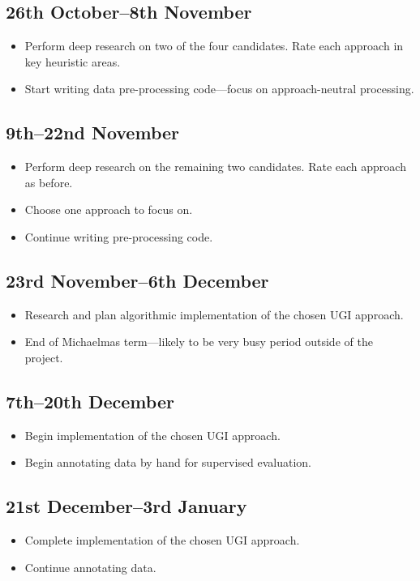 \documentclass{article}
\begin{document}
\subsection{26th October--8th November}
\begin{itemize}
    \item Perform deep research on two of the four candidates. Rate each approach in key heuristic areas.
    \item Start writing data pre-processing code---focus on approach-neutral processing. 
\end{itemize}

\subsection{9th--22nd November}
\begin{itemize}
    \item Perform deep research on the remaining two candidates. Rate each approach as before.
    \item Choose one approach to focus on.
    \item Continue writing pre-processing code.
\end{itemize}

\subsection{23rd November--6th December}
\begin{itemize}
    \item Research and plan algorithmic implementation of the chosen UGI approach.
    \item End of Michaelmas term---likely to be very busy period outside of the project.
\end{itemize}

\subsection{7th--20th December}
\begin{itemize}
    \item Begin implementation of the chosen UGI approach.
    \item Begin annotating data by hand for supervised evaluation.
\end{itemize}

\subsection{21st December--3rd January}
\begin{itemize}
    \item Complete implementation of the chosen UGI approach.
    \item Continue annotating data.
\end{itemize}
\end{document}
